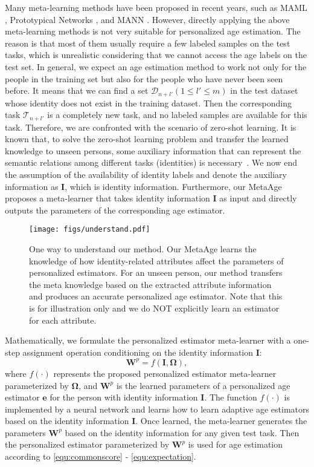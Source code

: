 \documentclass[journal,twoside]{IEEEtran}
\begin{document}
Many meta-learning methods have been proposed in recent years, such as MAML \cite{finn2017model}, Prototypical Networks \cite{snell2017prototypical}, and MANN \cite{santoro2016meta}. However, directly applying the above meta-learning methods is not very suitable for personalized age estimation. The reason is that most of them usually require a few labeled samples on the test tasks, which is unrealistic considering that we cannot access the age labels on the test set. In general, we expect an age estimation method to work not only for the people in the training set but also for the people who have never been seen before. It means that we can find a set $\mathcal{D}_{n+l'} (1 \leq l' \leq m)$ in the test dataset whose identity does not exist in the training dataset. Then the corresponding task $\mathcal{T}_{n+l'}$ is a completely new task, and no labeled samples are available for this task. Therefore, we are confronted with the scenario of zero-shot learning. It is known that, to solve the zero-shot learning problem and transfer the learned knowledge to unseen persons, some auxiliary information that can represent the semantic relations among different tasks (identities) is necessary~\cite{wang2019survey}. We now end the assumption of the availability of identity labels and denote the auxiliary information as $\bm{I}$, which is identity information. Furthermore, our MetaAge proposes a meta-learner that takes identity information $\bm{I}$ as input and directly outputs the parameters of the corresponding age estimator.

\begin{figure*}[t]
  \centering
  \texttt{[image: figs/understand.pdf]}
  \caption{One way to understand our method. Our MetaAge learns the knowledge of  how identity-related attributes affect the parameters of personalized estimators. For an unseen person, our method transfers the meta knowledge based on the extracted attribute information and produces an accurate personalized age estimator. Note that this is for illustration only and we do NOT explicitly learn an estimator for each attribute.}
  \label{fig:understand}
\end{figure*}

Mathematically, we formulate the personalized estimator meta-learner with a one-step assignment operation conditioning on the identity information $\bm{I}$:
\begin{equation}
\bm{W}^{p} = f(\bm{I},\bm{\Omega}),
\label{equ:metalearner}
\end{equation}
where $f(\cdot)$ represents the proposed personalized estimator meta-learner parameterized by $\bm{\Omega}$, and $\bm{W}^{p}$ is the learned parameters of a personalized age estimator $\bm{e}$ for the person with identity information $\bm{I}$. The function $f(\cdot)$ is implemented by a neural network and learns how to learn adaptive age estimators based on the identity information $\bm{I}$. Once learned, the meta-learner generates the parameters $\bm{W}^{p}$ based on the identity information for any given test task. Then the personalized estimator parameterized by $\bm{W}^{p}$ is used for age estimation according to \eqref{equ:commonscore} - \eqref{equ:expectation}.
\end{document}
